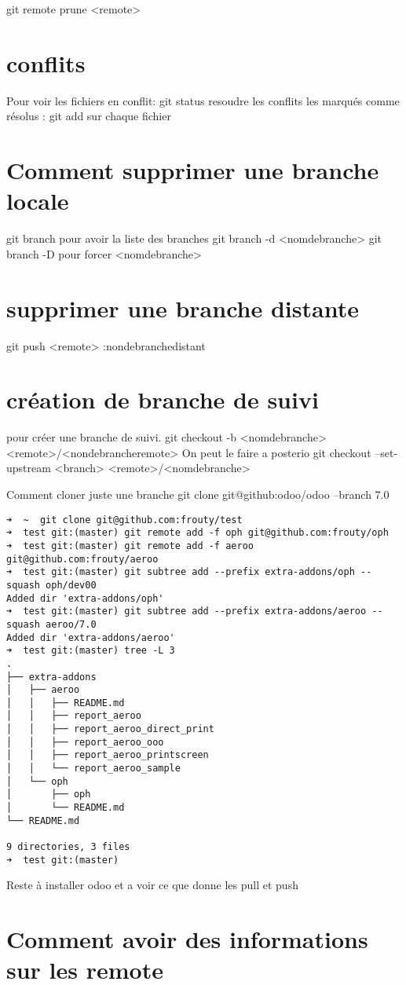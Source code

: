 \documentclass[12pt,a4paper]{article}
\begin{document}
git remote prune <remote>

\section{conflits}
Pour voir les fichiers en conflit: git status
resoudre les conflits
les marqués comme résolus : git add  sur chaque fichier

\section{Comment supprimer une branche locale}
git branch pour avoir la liste des branches
git branch -d <nomdebranche>
git branch -D pour forcer <nomdebranche>
\section{supprimer une branche distante}
git push <remote> :nondebranchedistant

\section{création de branche de suivi}
pour créer une branche de suivi.
git checkout -b <nomdebranche> <remote>/<nondebrancheremote>
On peut le faire a posterio
git checkout --set-upstream <branch> <remote>/<nomdebranche>

Comment cloner juste une branche 
git clone git@github:odoo/odoo --branch 7.0
\begin{verbatim}
➜  ~  git clone git@github.com:frouty/test
➜  test git:(master) git remote add -f oph git@github.com:frouty/oph           
➜  test git:(master) git remote add -f aeroo git@github.com:frouty/aeroo
➜  test git:(master) git subtree add --prefix extra-addons/oph --squash oph/dev00
Added dir 'extra-addons/oph'
➜  test git:(master) git subtree add --prefix extra-addons/aeroo --squash aeroo/7.0
Added dir 'extra-addons/aeroo'
➜  test git:(master) tree -L 3
.
├── extra-addons
│   ├── aeroo
│   │   ├── README.md
│   │   ├── report_aeroo
│   │   ├── report_aeroo_direct_print
│   │   ├── report_aeroo_ooo
│   │   ├── report_aeroo_printscreen
│   │   └── report_aeroo_sample
│   └── oph
│       ├── oph
│       └── README.md
└── README.md

9 directories, 3 files
➜  test git:(master) 
\end{verbatim}

Reste à installer odoo et a voir ce que donne les pull et push

\section{Comment avoir des informations sur les remote}
\label{sec:remote}
\end{document}
